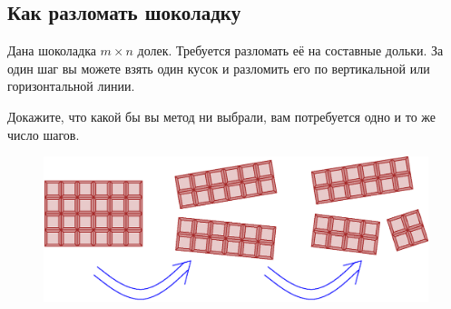 \subsection*{Как разломать шоколадку}%

Дана шоколадка $m\times n$ долек. 
Требуется разломать её на составные дольки.
За один шаг вы можете взять один кусок и разломить его по вертикальной или горизонтальной линии.

Докажите, что какой бы вы метод ни выбрали, вам потребуется одно и то же  число шагов.

\begin{figure}[h!]
\centering
\includegraphics[scale=0.5]{Figs/Algorithms/bar}
\end{figure}
